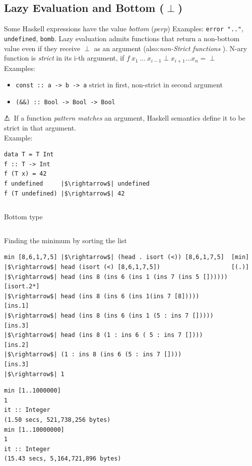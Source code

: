 \documentclass{article}
\newcommand{\Haskell}[1]{\texttt{#1}}
\begin{document}
\subsection{Lazy Evaluation and Bottom ($\perp$)}
Some Haskell expressions have the value \emph{bottom} ($perp$) Examples: \Haskell{error ".."}, \Haskell{undefined}, \Haskell{bomb}. Lazy evaluation admits functions that return a non-bottom value even if they receive $\perp$ as an argument (also:{\em non-Strict functions }).
N-ary function is \emph{strict} in its i-th argument, if $f\ x_1\ \ldots\ x_{i-1} \perp x_{i+1} \ldots x_n = \perp$\\
Examples:
\begin{itemize}
\item \Haskell{const :: a -> b -> a} strict in first, non-strict in second argument
\item \Haskell{(&&) :: Bool -> Bool -> Bool}
\end{itemize}
$\bigtriangleup\! \hspace*{-0.45em}!\hspace*{0.45em}$ If a function \emph{pattern matches} an argument, Haskell semantics define it to be strict in that argument.\\
Example:\\
\begin{verbatim}
data T = T Int
f :: T -> Int
f (T x) = 42
f undefined     |$\rightarrow$| undefined
f (T undefined) |$\rightarrow$| 42
\end{verbatim}
\begin{listing}[h!]
\inputminted{Haskell}{bottom.hs}
\caption{Bottom type}
\end{listing}
\begin{listing}[h!]
\inputminted{Haskell}{min.hs}
\caption{Finding the minimum by sorting the list}
\end{listing}
\begin{verbatim}
min [8,6,1,7,5] |$\rightarrow$| (head . isort (<)) [8,6,1,7,5]  [min]
|$\rightarrow$| head (isort (<) [8,6,1,7,5])                    [(.)]
|$\rightarrow$| head (ins 8 (ins 6 (ins 1 (ins 7 (ins 5 []))))) [isort.2*]
|$\rightarrow$| head (ins 8 (ins 6 (ins 1(ins 7 [8]))))         [ins.1]
|$\rightarrow$| head (ins 8 (ins 6 (ins 1 (5 : ins 7 []))))     [ins.3]
|$\rightarrow$| head (ins 8 (1 : ins 6 ( 5 : ins 7 [])))        [ins.2]
|$\rightarrow$| (1 : ins 8 (ins 6 (5 : ins 7 [])))              [ins.3]
|$\rightarrow$| 1
\end{verbatim}
\begin{verbatim}
min [1..1000000]
1
it :: Integer
(1.50 secs, 521,738,256 bytes)
min [1..10000000]
1
it :: Integer
(15.43 secs, 5,164,721,896 bytes)
\end{verbatim}
\clearpage
\end{document}
